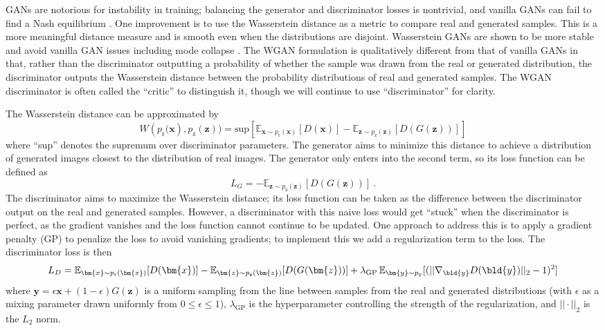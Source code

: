 GANs are notorious for instability in training; balancing the generator and discriminator losses is nontrivial, and vanilla GANs can fail to find a Nash equilibrium \citep{Salimans2016}.
One improvement is to use the Wasserstein distance as a metric to compare real and generated samples.
This is a more meaningful distance measure and is smooth even when the distributions are disjoint.
Wasserstein GANs are shown to be more stable and avoid vanilla GAN issues including mode collapse \citep{Arjovsky2017}.
The WGAN formulation is qualitatively different from that of vanilla GANs in that, rather than the discriminator outputting a probability of whether the sample was drawn from the real or generated distribution, the discriminator outputs the Wasserstein distance between the probability distributions of real and generated samples.
The WGAN discriminator is often called the ``critic'' to distinguish it, though we will continue to use ``discriminator'' for clarity.

The Wasserstein distance can be approximated by
\begin{equation}
    W\left(p_{\mathrm{r}}(\bm{x}\right), p_{\mathrm{z}}(\bm{z})) 
    = \text{sup}\left[ \mathbb{E}_{\bm{x}\sim p_{\mathrm{r}}(\bm{x})}[D(\bm{x})]
    - \mathbb{E}_{\bm{z}\sim p_{\mathrm{z}}(\bm{z})}[D(G(\bm{z}))]
    \right]
\end{equation}
where ``sup'' denotes the supremum over discriminator parameters. 
The generator aims to minimize this distance to achieve a distribution of generated images closest to the distribution of real images.
The generator only enters into the second term, so its loss function can be defined as
\begin{equation}
    L_G
    = - \mathbb{E}_{\bm{z}\sim p_{\mathrm{z}}(\bm{z})}[D(G(\bm{z}))] ~.
\end{equation}
The discriminator aims to maximize the Wasserstein distance; its loss function can be taken as the difference between the discriminator output on the real and generated samples.
However, a discriminator with this naive loss would get ``stuck'' when the discriminator is perfect, as the gradient vanishes and the loss function cannot continue to be updated.
One approach to address this is to apply a gradient penalty (GP) to penalize the loss to avoid vanishing gradients; to implement this we add a regularization term to the loss.
The discriminator loss is then
\begin{equation}
  L_D
  = \mathbb{E}_{\bm{x}\sim p_{\mathrm{r}}(\bm{x})}[D(\bm{x})]
  - \mathbb{E}_{\bm{z}\sim p_{\mathrm{z}}(\bm{z})}[D(G(\bm{z}))]
  + \lambda_\text{GP} \, \mathbb{E}_{{\bm{y}}\sim p_{\mathrm{y}}} [(||\nabla_{\bld{y}}D(\bld{y})||_2 - 1)^2]
\end{equation}
where $\bm{y} = \epsilon \bm{x} + (1-\epsilon)G(\bm{z})$ is a uniform sampling from the line between samples from the real and generated distributions (with $\epsilon$ as a mixing parameter drawn uniformly from $0\leq\epsilon\leq1$), $\lambda_\text{GP}$ is the hyperparameter controlling the strength of the regularization, and $||\cdot||_2$ is the $L_2$ norm.

